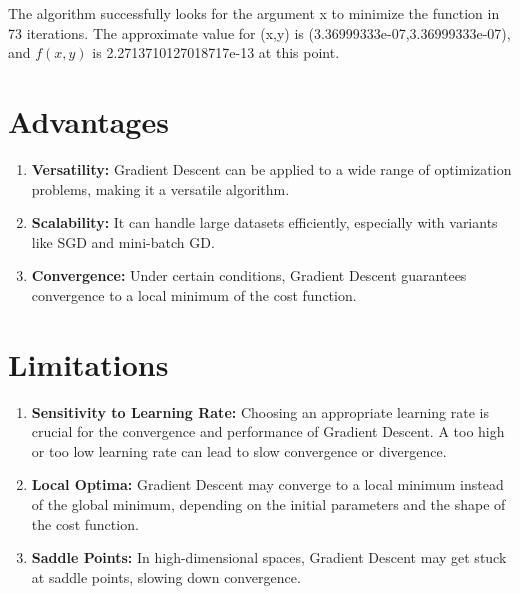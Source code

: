 \documentclass{article}
\begin{document}
The algorithm successfully looks for the argument x to minimize the function in 73 iterations.  The approximate value for (x,y) is (3.36999333e-07,3.36999333e-07), and $f(x,y)$ is 2.2713710127018717e-13 at this point. 

\section{Advantages}
\begin{enumerate}
    \item \textbf{Versatility:} Gradient Descent can be applied to a wide range of optimization problems, making it a versatile algorithm.
    \item \textbf{Scalability:} It can handle large datasets efficiently, especially with variants like SGD and mini-batch GD.
    \item \textbf{Convergence:} Under certain conditions, Gradient Descent guarantees convergence to a local minimum of the cost function.
\end{enumerate}

\section{Limitations}
\begin{enumerate}
    \item \textbf{Sensitivity to Learning Rate:} Choosing an appropriate learning rate is crucial for the convergence and performance of Gradient Descent. A too high or too low learning rate can lead to slow convergence or divergence.
    \item \textbf{Local Optima:} Gradient Descent may converge to a local minimum instead of the global minimum, depending on the initial parameters and the shape of the cost function.
    \item \textbf{Saddle Points:} In high-dimensional spaces, Gradient Descent may get stuck at saddle points, slowing down convergence.
\end{enumerate}
\end{document}
